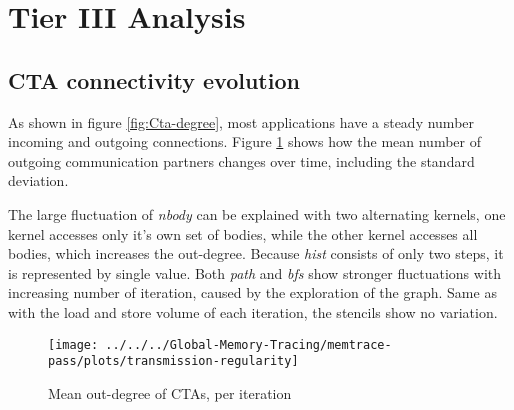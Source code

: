 \section{Tier III Analysis}

\subsection{CTA connectivity evolution}
As shown in figure \ref{fig:Cta-degree}, most applications have a steady number incoming and outgoing connections. Figure \ref{philandering} shows how the mean number of outgoing communication partners changes over time, including the standard deviation. 

The large fluctuation of \textit{nbody} can be explained with two alternating kernels, one kernel accesses only it's own set of bodies, while the other kernel accesses all bodies, which increases the out-degree. Because \textit{hist} consists of only two steps, it is represented by single value. Both \textit{path} and \textit{bfs} show stronger fluctuations with increasing number of iteration, caused by the exploration of the graph. Same as with the load and store volume of each iteration, the stencils show no variation.

\begin{figure}[h!]
	\centering
		\texttt{[image: ../../../Global-Memory-Tracing/memtrace-pass/plots/transmission-regularity]}
	\caption{Mean out-degree of CTAs, per iteration}
	\label{philandering}
\end{figure}